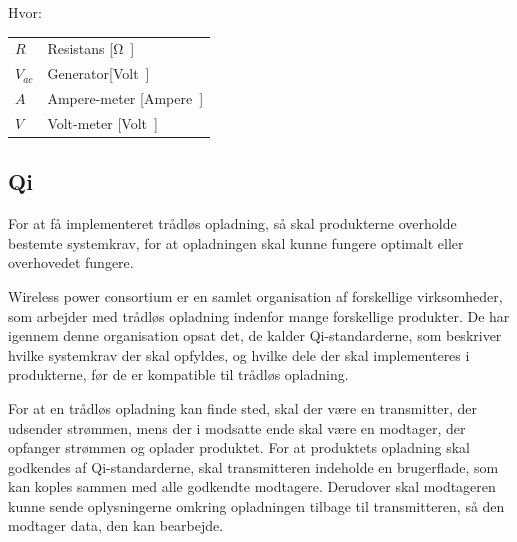 Hvor:
\begin{table}[H]
	\begin{tabular}{l|l}
	$R$     & Resistans [\si \ohm] \\
	$V_{ac}$ 	   &  Generator[\si Volt] \\
	$A$ 	   & Ampere-meter [\si Ampere] \\
	$V$			& Volt-meter [\si Volt]
	\end{tabular}
\end{table}

\subsection{Qi}
For at få implementeret trådløs opladning, så skal produkterne overholde bestemte systemkrav, for at opladningen skal kunne fungere optimalt eller overhovedet fungere.

Wireless power consortium er en samlet organisation af forskellige virksomheder, som arbejder med trådløs opladning indenfor mange forskellige produkter. De har igennem denne organisation opsat det, de kalder Qi-standarderne, som beskriver hvilke systemkrav der skal opfyldes, og hvilke dele der skal implementeres i produkterne, før de er kompatible til trådløs opladning.

For at en trådløs opladning kan finde sted, skal der være en transmitter, der udsender strømmen, mens der i modsatte ende skal være en modtager, der opfanger strømmen og oplader produktet. For at produktets opladning skal godkendes af Qi-standarderne, skal transmitteren indeholde en brugerflade, som kan koples sammen med alle godkendte modtagere. Derudover skal modtageren kunne sende oplysningerne omkring opladningen tilbage til transmitteren, så den modtager data, den kan bearbejde.
